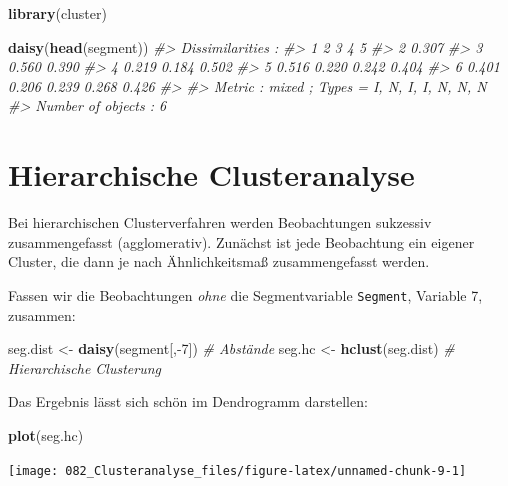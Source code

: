 \documentclass[12pt,]{book}
\makeatletter
\newenvironment{Shaded}{\begin{snugshade}}{\end{snugshade}}
\newcommand{\KeywordTok}[1]{\textcolor[rgb]{0.13,0.29,0.53}{\textbf{{#1}}}}
\newcommand{\DecValTok}[1]{\textcolor[rgb]{0.00,0.00,0.81}{{#1}}}
\newcommand{\StringTok}[1]{\textcolor[rgb]{0.31,0.60,0.02}{{#1}}}
\newcommand{\CommentTok}[1]{\textcolor[rgb]{0.56,0.35,0.01}{\textit{{#1}}}}
\newcommand{\NormalTok}[1]{{#1}}
\newenvironment{kframe}{%
\medskip{}
\setlength{\fboxsep}{.8em}
 \def\at@end@of@kframe{}%
 \ifinner\ifhmode%
  \def\at@end@of@kframe{\end{minipage}}%
  \begin{minipage}{\columnwidth}%
 \fi\fi%
 \def\FrameCommand##1{\hskip\@totalleftmargin \hskip-\fboxsep
 \colorbox{shadecolor}{##1}\hskip-\fboxsep
     \hskip-\linewidth \hskip-\@totalleftmargin \hskip\columnwidth}%
 \MakeFramed {\advance\hsize-\width
   \@totalleftmargin\z@ \linewidth\hsize
   \@setminipage}}%
 {\par\unskip\endMakeFramed%
 \at@end@of@kframe}
\renewenvironment{Shaded}{\begin{kframe}}{\end{kframe}}
\makeatother
\begin{document}
\begin{Shaded}
\begin{Highlighting}[]
\KeywordTok{library}\NormalTok{(cluster)}

\KeywordTok{daisy}\NormalTok{(}\KeywordTok{head}\NormalTok{(segment))}
\CommentTok{#> Dissimilarities :}
\CommentTok{#>       1     2     3     4     5}
\CommentTok{#> 2 0.307                        }
\CommentTok{#> 3 0.560 0.390                  }
\CommentTok{#> 4 0.219 0.184 0.502            }
\CommentTok{#> 5 0.516 0.220 0.242 0.404      }
\CommentTok{#> 6 0.401 0.206 0.239 0.268 0.426}
\CommentTok{#> }
\CommentTok{#> Metric :  mixed ;  Types = I, N, I, I, N, N, N }
\CommentTok{#> Number of objects : 6}
\end{Highlighting}
\end{Shaded}

\section{Hierarchische
Clusteranalyse}\label{hierarchische-clusteranalyse}

Bei hierarchischen Clusterverfahren werden Beobachtungen sukzessiv
zusammengefasst (agglomerativ). Zunächst ist jede Beobachtung ein
eigener Cluster, die dann je nach Ähnlichkeitsmaß zusammengefasst
werden.

Fassen wir die Beobachtungen \emph{ohne} die Segmentvariable
\texttt{Segment}, Variable 7, zusammen:

\begin{Shaded}
\begin{Highlighting}[]
\NormalTok{seg.dist <-}\StringTok{ }\KeywordTok{daisy}\NormalTok{(segment[,-}\DecValTok{7}\NormalTok{]) }\CommentTok{# Abstände}
\NormalTok{seg.hc <-}\StringTok{ }\KeywordTok{hclust}\NormalTok{(seg.dist) }\CommentTok{# Hierarchische Clusterung}
\end{Highlighting}
\end{Shaded}

Das Ergebnis lässt sich schön im Dendrogramm darstellen:

\begin{Shaded}
\begin{Highlighting}[]
\KeywordTok{plot}\NormalTok{(seg.hc)}
\end{Highlighting}
\end{Shaded}

\begin{center}\texttt{[image: 082\_Clusteranalyse\_files/figure-latex/unnamed-chunk-9-1]} \end{center}
\end{document}

